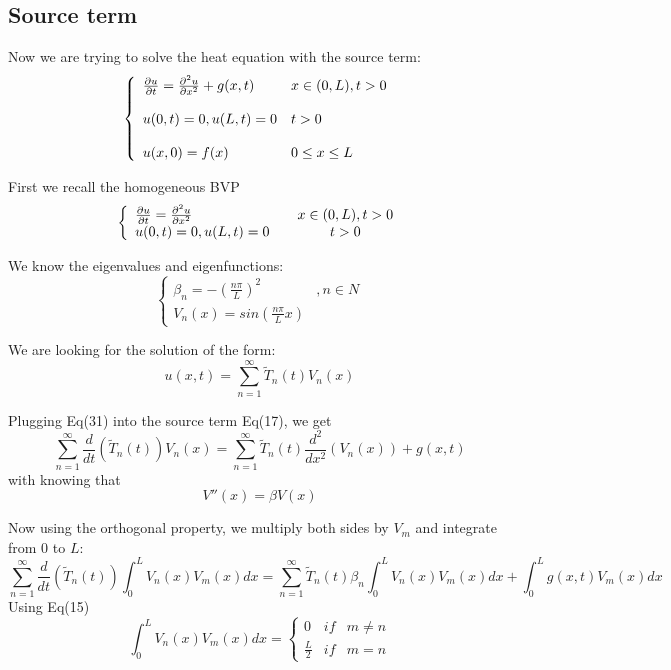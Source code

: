 \documentclass[12pt]{article} %
\begin{document}
\subsection{Source term}
\hspace{5mm}Now we are trying to solve the heat equation with the source term:
\begin{equation}
\left \{ \begin{array}{llc}
\pdv{u}{t} =\frac{\partial^{2}u}{\partial x^{2}} + g(x, t)& x \in (0,L),  t>0 \\ \\
u(0,t) = 0, u(L, t) = 0& t>0 \\ \\
u(x, 0) = f(x) & 0 \leq x \leq L
\end{array}\right.
\end{equation}\par
First we recall the homogeneous BVP
$$
\left \{ \begin{array}{llc}
\pdv{u}{t} =\frac{\partial^{2}u}{\partial x^{2}} & & x \in (0,L),  t>0 \\
u(0,t) = 0, u(L, t) = 0 && t>0 
\end{array}\right.
$$\par 
We know the eigenvalues and eigenfunctions:
$$
\left\{
 \begin{array}{lcc}
 \beta_{n} = - \left(
\frac{n \pi}{L}
\right)^{2} &, n \in N \\
V_{n}(x) = sin(\frac{n\pi}{L}x)
 \end{array} \right.
$$\par
We are looking for the solution of the form:
\begin{equation}
u(x, t) = \sum_{n=1}^{\infty}\tilde{T}_{n}(t)V_{n}(x)
\end{equation}\par
Plugging Eq(31) into the source term Eq(17), we get
$$
\sum_{n=1}^{\infty}\frac{d}{dt}(\tilde{T}_{n}(t))V_{n}(x) = \sum_{n=1}^{\infty}\tilde{T}_{n}(t) \frac{d^{2}}{dx^{2}}(V_{n}(x)) + g(x, t)
$$
with knowing that 
$$
V''(x) = \beta V(x)
$$\par
Now using the orthogonal property, we multiply both sides by $V_{m}$ and integrate from 0 to $L$:
$$
\sum_{n=1}^{\infty}\frac{d}{dt}(\tilde{T}_{n}(t))\int_{0}^{L}V_{n}(x)V_{m}(x)dx = \sum_{n=1}^{\infty}\tilde{T}_{n}(t)\beta_{n} \int_{0}^{L}V_{n}(x)V_{m}(x)dx  + \int_{0}^{L}g(x, t)V_{m}(x)dx 
$$
Using Eq(15)
$$
\int_{0}^{L}V_{n}(x)V_{m}(x)dx = 
\left\{
\begin{array}{lcc}
0 & if & m \neq n \\
\frac{L}{2} & if& m = n
\end{array}
\right.
$$\par
\end{document}
